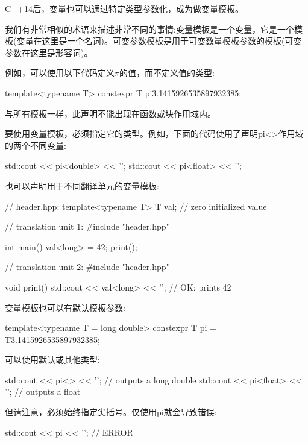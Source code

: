 C++14后，变量也可以通过特定类型参数化，成为做变量模板。

\begin{notice}我们有非常相似的术语来描述非常不同的事情:变量模板是一个变量，它是一个模板(变量在这里是一个名词)。可变参数模板是用于可变数量模板参数的模板(可变参数在这里是形容词)。
\end{notice}

例如，可以使用以下代码定义$\pi$的值，而不定义值的类型:

\begin{cpp}
template<typename T>
constexpr T pi{3.1415926535897932385};
\end{cpp}

与所有模板一样，此声明不能出现在函数或块作用域内。

要使用变量模板，必须指定它的类型。例如，下面的代码使用了声明pi<>作用域的两个不同变量:

\begin{cpp}
std::cout << pi<double> << '\n';
std::cout << pi<float> << '\n';
\end{cpp}

也可以声明用于不同翻译单元的变量模板:

\begin{cpp}
// header.hpp:
template<typename T> T val{}; // zero initialized value

// translation unit 1:
#include "header.hpp"

int main()
{
	val<long> = 42;
	print();
}

// translation unit 2:
#include "header.hpp"

void print()
{
	std::cout << val<long> << '\n'; // OK: prints 42
}
\end{cpp}

变量模板也可以有默认模板参数:

\begin{cpp}
template<typename T = long double>
constexpr T pi = T{3.1415926535897932385};
\end{cpp}

可以使用默认或其他类型:

\begin{cpp}
std::cout << pi<> << '\n'; // outputs a long double
std::cout << pi<float> << '\n'; // outputs a float
\end{cpp}

但请注意，必须始终指定尖括号。仅使用pi就会导致错误:

\begin{cpp}
std::cout << pi << '\n'; // ERROR
\end{cpp}

